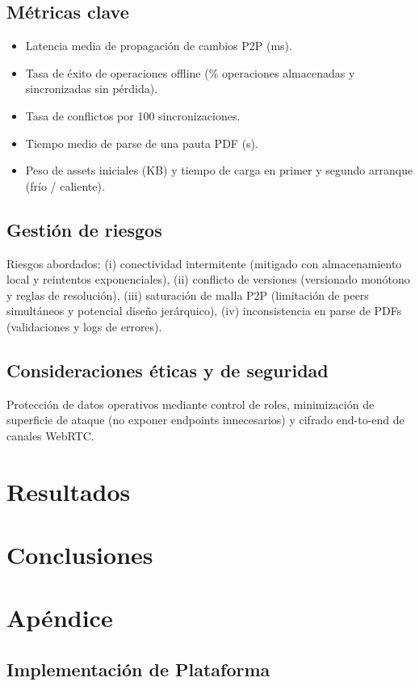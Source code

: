 \documentclass[12pt,a4paper]{report}
\begin{document}
\section*{Métricas clave} \begin{itemize} \item Latencia media de propagación de cambios P2P (ms). \item Tasa de éxito de operaciones offline (\% operaciones almacenadas y sincronizadas sin pérdida). \item Tasa de conflictos por 100 sincronizaciones. \item Tiempo medio de parse de una pauta PDF (s). \item Peso de assets iniciales (KB) y tiempo de carga en primer y segundo arranque (frío / caliente). \end{itemize}

\section*{Gestión de riesgos} Riesgos abordados: (i) conectividad intermitente (mitigado con almacenamiento local y reintentos exponenciales), (ii) conflicto de versiones (versionado monótono y reglas de resolución), (iii) saturación de malla P2P (limitación de peers simultáneos y potencial diseño jerárquico), (iv) inconsistencia en parse de PDFs (validaciones y logs de errores).

\section*{Consideraciones éticas y de seguridad} Protección de datos operativos mediante control de roles, minimización de superficie de ataque (no exponer endpoints innecesarios) y cifrado end-to-end de canales WebRTC.

\chapter*{Resultados}


\chapter*{Conclusiones}


\appendix
\chapter*{Apéndice}
\section*{Implementación de Plataforma}
\end{document}
